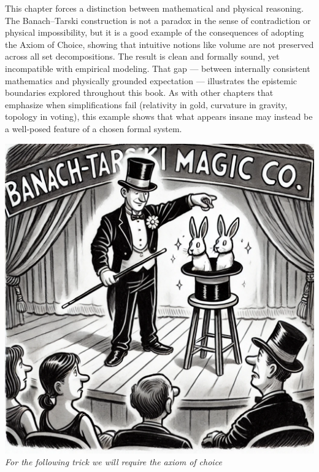 \begin{commentary}[Commentary]
This chapter forces a distinction between mathematical and physical reasoning. The Banach–Tarski construction is not a paradox in the sense of contradiction or physical impossibility, but it is a good example of the consequences of adopting the Axiom of Choice, showing that intuitive notions like volume are not preserved across all set decompositions. The result is clean and formally sound, yet incompatible with empirical modeling. That gap — between internally consistent mathematics and physically grounded expectation — illustrates the epistemic boundaries explored throughout this book. As with other chapters that emphasize when simplifications fail (relativity in gold, curvature in gravity, topology in voting), this example shows that what appears insane may instead be a well-posed feature of a chosen formal system.

\end{commentary}
\vspace{2em}
\begin{center}
    \includegraphics[height=10\baselineskip]{01_BanachTarskiParadox/BANACH1.png}\\
    {\small\textit{For the following trick we will require the axiom of choice}}
\end{center}